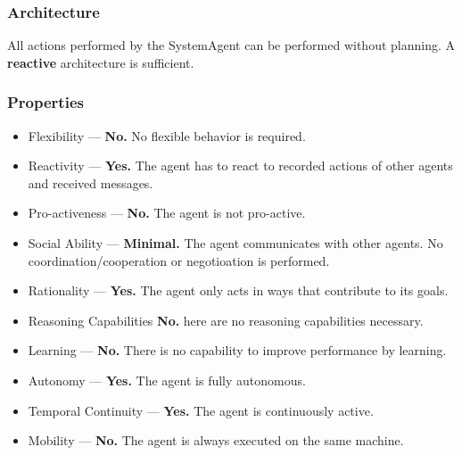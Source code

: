 \subsubsection*{Architecture}

All actions performed by the SystemAgent can be performed without planning. A \textbf{reactive} architecture is sufficient.

\subsubsection*{Properties}

\begin{itemize}
	\item Flexibility — \textbf{No.} No flexible behavior is required.
	\item Reactivity — \textbf{Yes.} The agent has to react to recorded actions of other agents and received messages.
	\item Pro-activeness — \textbf{No.} The agent is not pro-active.
	\item Social Ability — \textbf{Minimal.} The agent communicates with other agents. No coordination/cooperation or negotioation is performed.
	\item Rationality — \textbf{Yes.} The agent only acts in ways that contribute to its goals.
	\item Reasoning Capabilities \textbf{No.} here are no reasoning capabilities necessary.
	\item Learning — \textbf{No.} There is no capability to improve performance by learning.
	\item Autonomy — \textbf{Yes.} The agent is fully autonomous.
	\item Temporal Continuity — \textbf{Yes.} The agent is continuously active.
	\item Mobility — \textbf{No.} The agent is always executed on the same machine.
\end{itemize}